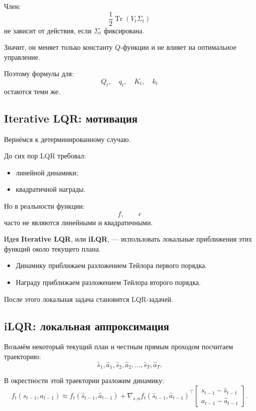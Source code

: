 \documentclass[12pt,a4paper]{article}
\begin{document}
Член:
\[
\frac{1}{2}\operatorname{Tr}(V_t\Sigma_t)
\]
не зависит от действия, если $\Sigma_t$ фиксирована.

Значит, он меняет только константу $Q$-функции и не влияет на оптимальное управление.

Поэтому формулы для:
\[
Q_t,\quad q_t,\quad K_t,\quad k_t
\]
остаются теми же.

\subsection{Iterative LQR: мотивация}

Вернёмся к детерминированному случаю.

До сих пор LQR требовал:
\begin{itemize}
    \item линейной динамики;
    \item квадратичной награды.
\end{itemize}

Но в реальности функции:
\[
f,
\qquad
r
\]
часто не являются линейными и квадратичными.

Идея \textbf{Iterative LQR}, или \textbf{iLQR}, --- использовать локальные приближения этих функций около текущего плана.

\begin{itemize}
    \item Динамику приближаем разложением Тейлора первого порядка.
    \item Награду приближаем разложением Тейлора второго порядка.
\end{itemize}

После этого локальная задача становится LQR-задачей.

\subsection{iLQR: локальная аппроксимация}

Возьмём некоторый текущий план и честным прямым проходом посчитаем траекторию:
\[
\hat s_1,\hat a_1,\hat s_2,\hat a_2,\ldots,\hat s_T,\hat a_T.
\]

В окрестности этой траектории разложим динамику:
\[
f_t(s_{t-1},a_{t-1})
\approx
f_t(\hat s_{t-1},\hat a_{t-1})
+
\nabla_{s,a} f_t(\hat s_{t-1},\hat a_{t-1})^\top
\begin{bmatrix}
s_{t-1}-\hat s_{t-1}\\
a_{t-1}-\hat a_{t-1}
\end{bmatrix}.
\]
\end{document}
